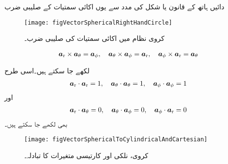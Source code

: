 دائیں ہاتھ کے قانون  یا شکل  کی مدد سے یوں اکائی سمتیات کے صلیبی ضرب
\begin{figure}
\centering
\texttt{[image: figVectorSphericalRightHandCircle]}
\caption{کروی نظام میں اکائی سمتیات کی صلیبی ضرب۔}
\label{شکل_سمتیہ_کروی_صلیبی_ضرب_اکائی_سمتیات}
\end{figure}

\begin{align}
\ar \times \atheta=\aphi, \quad \atheta \times \aphi=\ar, \quad \aphi \times \ar =\atheta
\end{align}

لکھے جا سکتے ہیں۔اسی طرح
\begin{align}
\ar \cdot \ar=1, \quad \atheta \cdot \atheta=1, \quad \aphi \cdot \aphi=1
\end{align}
اور
\begin{align}
\ar \cdot \atheta=0, \quad \atheta \cdot \aphi=0, \quad \aphi \cdot \ar=0
\end{align}
بھی لکھے جا سکتے ہیں۔

\begin{figure}
\centering
\texttt{[image: figVectorSphericalToCylindricalAndCartesian]}
\caption{کروی، نلکی اور کارتیسی متغیرات کا تبادلہ۔}
\label{شکل_سمتیہ_کروی_نلکی_متغیرات_تبادلہ}
\end{figure}

